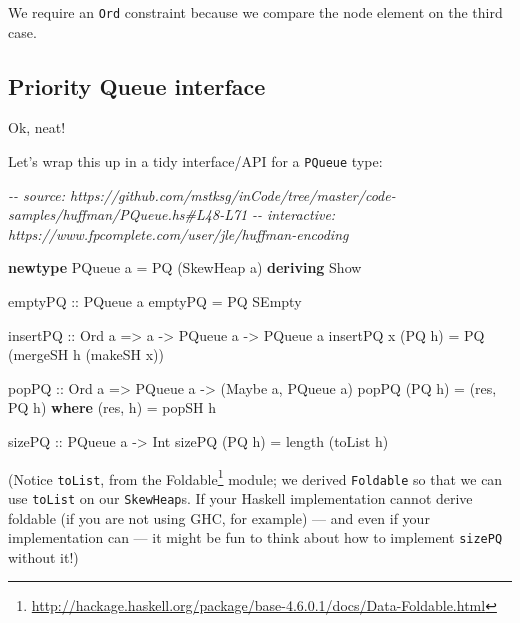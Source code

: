 \documentclass[]{article}
\newenvironment{Shaded}{}{}
\newcommand{\CommentTok}[1]{\textcolor[rgb]{0.38,0.63,0.69}{\textit{#1}}}
\newcommand{\DataTypeTok}[1]{\textcolor[rgb]{0.56,0.13,0.00}{#1}}
\newcommand{\FunctionTok}[1]{\textcolor[rgb]{0.02,0.16,0.49}{#1}}
\newcommand{\KeywordTok}[1]{\textcolor[rgb]{0.00,0.44,0.13}{\textbf{#1}}}
\newcommand{\NormalTok}[1]{#1}
\newcommand{\OtherTok}[1]{\textcolor[rgb]{0.00,0.44,0.13}{#1}}
\renewcommand{\href}[2]{#2\footnote{\url{#1}}}
\begin{document}
We require an \texttt{Ord} constraint because we compare the node element on the
third case.

\hypertarget{priority-queue-interface}{%
\subsection{Priority Queue interface}\label{priority-queue-interface}}

Ok, neat!

Let's wrap this up in a tidy interface/API for a \texttt{PQueue} type:

\begin{Shaded}
\begin{Highlighting}[]
\CommentTok{{-}{-} source: https://github.com/mstksg/inCode/tree/master/code{-}samples/huffman/PQueue.hs\#L48{-}L71}
\CommentTok{{-}{-} interactive: https://www.fpcomplete.com/user/jle/huffman{-}encoding}

\KeywordTok{newtype} \DataTypeTok{PQueue}\NormalTok{ a }\OtherTok{=} \DataTypeTok{PQ}\NormalTok{ (}\DataTypeTok{SkewHeap}\NormalTok{ a) }\KeywordTok{deriving} \DataTypeTok{Show}

\OtherTok{emptyPQ ::} \DataTypeTok{PQueue}\NormalTok{ a}
\NormalTok{emptyPQ }\OtherTok{=} \DataTypeTok{PQ} \DataTypeTok{SEmpty}

\OtherTok{insertPQ ::} \DataTypeTok{Ord}\NormalTok{ a }\OtherTok{=>}\NormalTok{ a }\OtherTok{{-}>} \DataTypeTok{PQueue}\NormalTok{ a }\OtherTok{{-}>} \DataTypeTok{PQueue}\NormalTok{ a}
\NormalTok{insertPQ x (}\DataTypeTok{PQ}\NormalTok{ h) }\OtherTok{=} \DataTypeTok{PQ}\NormalTok{ (mergeSH h (makeSH x))}

\OtherTok{popPQ ::} \DataTypeTok{Ord}\NormalTok{ a }\OtherTok{=>} \DataTypeTok{PQueue}\NormalTok{ a }\OtherTok{{-}>}\NormalTok{ (}\DataTypeTok{Maybe}\NormalTok{ a, }\DataTypeTok{PQueue}\NormalTok{ a)}
\NormalTok{popPQ (}\DataTypeTok{PQ}\NormalTok{ h) }\OtherTok{=}\NormalTok{ (res, }\DataTypeTok{PQ}\NormalTok{ h\textquotesingle{})}
  \KeywordTok{where}
\NormalTok{    (res, h\textquotesingle{}) }\OtherTok{=}\NormalTok{ popSH h}

\OtherTok{sizePQ ::} \DataTypeTok{PQueue}\NormalTok{ a }\OtherTok{{-}>} \DataTypeTok{Int}
\NormalTok{sizePQ (}\DataTypeTok{PQ}\NormalTok{ h) }\OtherTok{=} \FunctionTok{length}\NormalTok{ (toList h)}
\end{Highlighting}
\end{Shaded}

(Notice \texttt{toList}, from the
\href{http://hackage.haskell.org/package/base-4.6.0.1/docs/Data-Foldable.html}{Foldable}
module; we derived \texttt{Foldable} so that we can use \texttt{toList} on our
\texttt{SkewHeap}s. If your Haskell implementation cannot derive foldable (if
you are not using GHC, for example) --- and even if your implementation can ---
it might be fun to think about how to implement \texttt{sizePQ} without it!)
\end{document}
